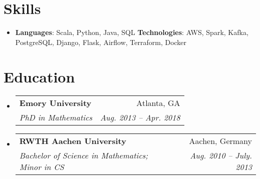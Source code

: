 \documentclass[letterpaper,11pt]{article}
\makeatletter
\newcommand{\resumeSubheading}[4]{
  \vspace{-1pt}\item
    \begin{tabular*}{0.97\textwidth}[t]{l@{\extracolsep{\fill}}r}
      \textbf{#1} & #2 \\
      \textit{\small#3} & \textit{\small #4} \\
    \end{tabular*}\vspace{-5pt}
}
\newcommand{\resumeSubHeadingListStart}{\begin{itemize}[leftmargin=*]}
\newcommand{\resumeSubHeadingListEnd}{\end{itemize}}
\makeatother
\begin{document}
%
\section{Skills}
  \resumeSubHeadingListStart
    \item{
      \textbf{Languages}{: Scala, Python, Java, SQL}
      \hfill
      \textbf{Technologies}{: AWS, Spark, Kafka, PostgreSQL, Django, Flask, Airflow, Terraform, Docker}
    }
  \resumeSubHeadingListEnd

\section{Education}
  \resumeSubHeadingListStart
    \resumeSubheading
      {Emory University}{Atlanta, GA}
      {PhD in Mathematics}{Aug. 2013 -- Apr. 2018}
    \resumeSubheading
      {RWTH Aachen University}{Aachen, Germany}
      {Bachelor of Science in Mathematics;  Minor in CS}{Aug. 2010 -- July. 2013}
  \resumeSubHeadingListEnd

\end{document}
